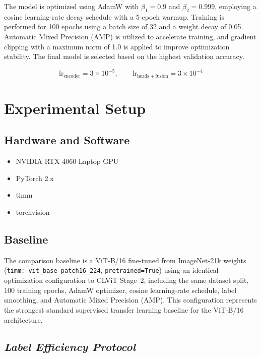 \documentclass[conference]{IEEEtran}
\begin{document}
The model is optimized using AdamW with $\beta_{1}=0.9$ and $\beta_{2}=0.999$, employing a cosine learning-rate decay schedule with a 5-epoch warmup. Training is performed for 100 epochs using a batch size of 32 and a weight decay of 0.05. Automatic Mixed Precision (AMP) is utilized to accelerate training, and gradient clipping with a maximum norm of 1.0 is applied to improve optimization stability. The final model is selected based on the highest validation accuracy.

\begin{equation}
\mathrm{lr}_{\mathrm{encoder}} = 3 \times 10^{-5},
\qquad
\mathrm{lr}_{\mathrm{heads+fusion}} = 3 \times 10^{-4}
\label{eq:lr}
\end{equation}

\section{Experimental Setup}

\subsection{Hardware and Software}

\begin{itemize}
\item NVIDIA RTX 4060 Laptop GPU
\item PyTorch 2.x
\item timm
\item torchvision
\end{itemize}

\subsection{Baseline}

The comparison baseline is a ViT-B/16 fine-tuned from ImageNet-21k weights (\texttt{timm: vit\_base\_patch16\_224}, \texttt{pretrained=True}) using an identical optimization configuration to CLViT Stage~2, including the same dataset split, 100 training epochs, AdamW optimizer, cosine learning-rate schedule, label smoothing, and Automatic Mixed Precision (AMP). This configuration represents the strongest standard supervised transfer learning baseline for the ViT-B/16 architecture.

\subsection{\textit{Label Efficiency Protocol}}
\end{document}
